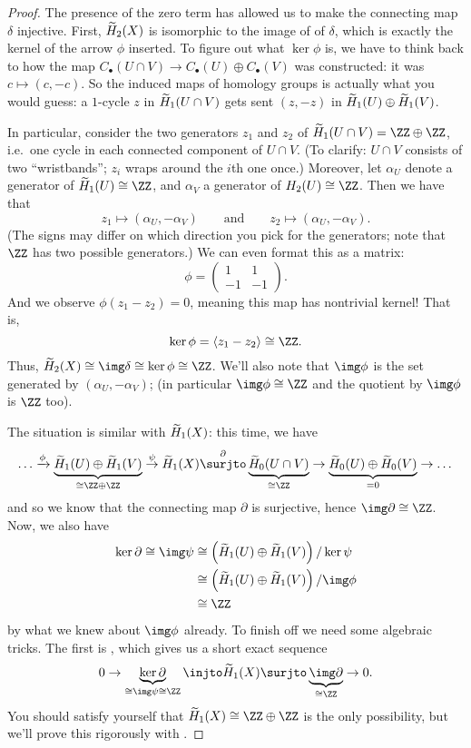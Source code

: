 \begin{proof}
	The presence of the zero term has allowed us to make the connecting map $\delta$ injective.
	First, $\widetilde H_2(X)$ is isomorphic to the image of of $\delta$, which is
	exactly the kernel of the arrow $\phi$ inserted.
	To figure out what $\ker \phi$ is, we have to think back to how the map
	$C_\bullet(U \cap V) \to C_\bullet(U) \oplus C_\bullet(V)$ was constructed:
	it was $c \mapsto (c, -c)$.
	So the induced maps of homology groups is actually what you would guess:
	a $1$-cycle $z$ in $\widetilde H_1(U \cap V)$ gets sent $(z, -z)$ in $\widetilde H_1(U) \oplus \widetilde H_1(V)$.

	In particular, consider the two generators $z_1$ and $z_2$ of
	$\wt H_1(U \cap V) = \ZZ \oplus \ZZ$,
	i.e.\ one cycle in each connected component of $U \cap V$.
	(To clarify: $U \cap V$ consists of two ``wristbands'';
	$z_i$ wraps around the $i$th one once.)
	Moreover, let $\alpha_U$ denote a generator of $\wt H_1(U) \cong \ZZ$,
	and $\alpha_V$ a generator of $H_2(U) \cong \ZZ$.
	Then we have that
	\[ z_1 \mapsto (\alpha_U, -\alpha_V) \qquad\text{and}\qquad z_2 \mapsto (\alpha_U, -\alpha_V). \]
	(The signs may differ on which direction you pick for the generators;
	note that $\ZZ$ has two possible generators.)
	We can even format this as a matrix:
	\[ \phi = \begin{pmatrix} 1 & 1 \\ -1 & -1 \end{pmatrix}. \]
	And we observe $\phi(z_1 - z_2) = 0$, meaning this map has nontrivial kernel!
	That is, \[ \ker\phi = \left< z_1 - z_2 \right> \cong \ZZ. \]
	Thus, $\wt H_2(X) \cong \img \delta \cong \ker \phi \cong \ZZ$.
	We'll also note that $\img \phi$ is the set generated by $(\alpha_U, -\alpha_V)$;
	(in particular $\img\phi \cong \ZZ$ and the quotient by $\img\phi$ is $\ZZ$ too).

	The situation is similar with $\widetilde H_1(X)$: this time, we have
	\[ 
		\dots 
		\xrightarrow{\phi} \underbrace{\wt H_1(U) \oplus \wt H_1(V)}_{\cong \ZZ \oplus \ZZ}
		\overset{\psi}{\to} \wt H_1(X) \overset\partial\surjto
		\underbrace{\wt H_0(U \cap V)}_{\cong \ZZ} 
		\to \underbrace{\wt H_0(U) \oplus \wt H_0(V)}_{=0} \to \dots
	\]
	and so we know that the connecting map $\partial$ is surjective,
	hence $\img \partial \cong \ZZ$.
	Now, we also have
	\begin{align*}
		\ker \partial \cong \img \psi &\cong \left( \wt H_1(U) \oplus \wt H_1(V) \right) / \ker \psi \\
		&\cong \left( \wt H_1(U) \oplus \wt H_1(V) \right) / \img \phi \\
		&\cong \ZZ
	\end{align*}
	by what we knew about $\img \phi$ already.
	To finish off we need some algebraic tricks. The first is ,
	which gives us a short exact sequence
	\[
		0 \to \underbrace{\ker\partial}_{\cong \img\psi \cong \ZZ} 
		\injto \wt H_1(X)
		\surjto \underbrace{\img\partial}_{\cong \ZZ} \to 0.
	\]
	You should satisfy yourself that $\wt H_1(X) \cong \ZZ \oplus \ZZ$ is the
	only possibility, but we'll prove this rigorously with .
\end{proof}

